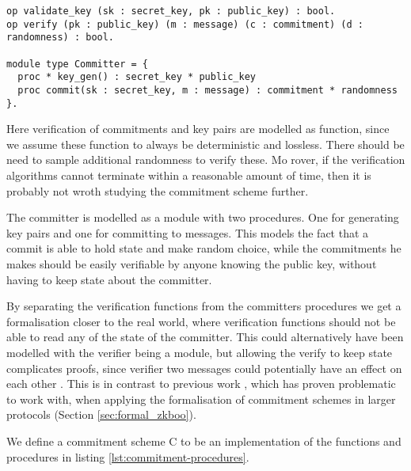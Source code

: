 \begin{lstlisting}[float,label=lst:commitment-procedures,caption= Key-Based commitment specification]
op validate_key (sk : secret_key, pk : public_key) : bool.
op verify (pk : public_key) (m : message) (c : commitment) (d : randomness) : bool.

module type Committer = {
  proc * key_gen() : secret_key * public_key
  proc commit(sk : secret_key, m : message) : commitment * randomness
}.
\end{lstlisting}
Here verification of commitments and key pairs are modelled as function, since
we assume these function to always be deterministic and lossless. There should
be need to sample additional randomness to verify these. Mo rover, if the
verification algorithms cannot terminate within a reasonable amount of time,
then it is probably not wroth studying the commitment scheme further.

The committer is modelled as a module with two procedures. One for generating
key pairs and one for committing to messages. This models the fact that a commit
is able to hold state and make random choice, while the commitments he makes
should be easily verifiable by anyone knowing the public key, without having to
keep state about the committer.

By separating the verification functions from the committers procedures we get a
formalisation closer to the real world, where verification functions should not
be able to read any of the state of the committer. This could alternatively have
been modelled with the verifier being a module, but allowing the verify to keep
state complicates proofs, since verifier two messages could potentially have an
effect on each other .
This is in contrast to previous work \cite{DBLP:journals/corr/MetereD17}, which
has proven problematic to work with, when applying the formalisation of
commitment schemes in larger protocols (Section \ref{sec:formal_zkboo}).

We define a commitment scheme C to be an implementation of the functions and procedures in listing \ref{lst:commitment-procedures}.



